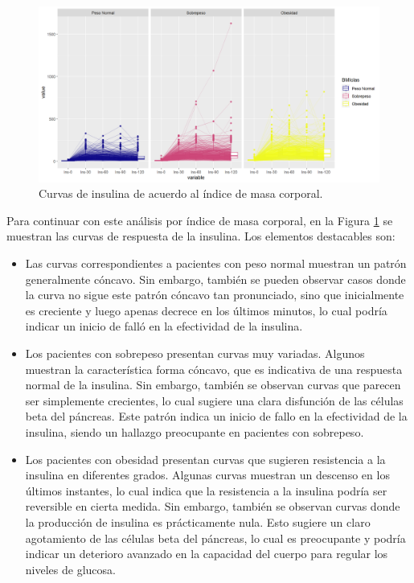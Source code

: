 \begin{figure}[H]
    \centering
    \includegraphics[width = 0.98 \textwidth]{Imagenes/insCurvasBMI.png}
    \caption{Curvas de insulina de acuerdo al índice de masa corporal.}
    \label{fig:CurvasInsIBM}
\end{figure}

Para continuar con este análisis por índice de masa corporal, en la Figura \ref{fig:CurvasInsIBM} se muestran las curvas de respuesta de la insulina. Los elementos destacables son:

\begin{itemize}
    \item  Las curvas correspondientes a pacientes con peso normal muestran un patrón generalmente cóncavo. Sin embargo, también se pueden observar casos donde la curva no sigue este patrón cóncavo tan pronunciado, sino que inicialmente es creciente y luego apenas decrece en los últimos minutos, lo cual podría indicar un inicio de falló en la efectividad de la insulina.

    \item Los pacientes con sobrepeso presentan curvas muy variadas. Algunos muestran la característica forma cóncavo, que es indicativa de una respuesta normal de la insulina. Sin embargo, también se observan curvas que parecen ser simplemente crecientes, lo cual sugiere una clara disfunción de las células beta del páncreas. Este patrón indica un inicio de fallo en la efectividad de la insulina, siendo un hallazgo preocupante en pacientes con sobrepeso.

    \item Los pacientes con obesidad presentan curvas que sugieren resistencia a la insulina en diferentes grados. Algunas curvas muestran un descenso en los últimos instantes, lo cual indica que la resistencia a la insulina podría ser reversible en cierta medida. Sin embargo, también se observan curvas donde la producción de insulina es prácticamente nula. Esto sugiere un claro agotamiento de las células beta del páncreas, lo cual es preocupante y podría indicar un deterioro avanzado en la capacidad del cuerpo para regular los niveles de glucosa.
    \end{itemize}

